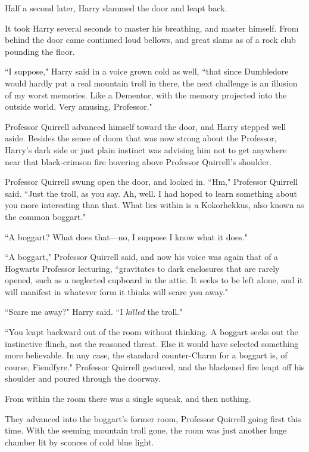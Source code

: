 \later

Half a second later, Harry slammed the door and leapt back.

It took Harry several seconds to master his breathing, and master himself. From behind the door came continued loud bellows, and great slams as of a rock club pounding the floor.

``I suppose," Harry said in a voice grown cold as well, ``that since Dumbledore would hardly put a real mountain troll in there, the next challenge is an illusion of my worst memories. Like a Dementor, with the memory projected into the outside world. Very amusing, Professor."

Professor Quirrell advanced himself toward the door, and Harry stepped well aside. Besides the sense of doom that was now strong about the Professor, Harry's dark side or just plain instinct was advising him not to get anywhere near that black-crimson fire hovering above Professor Quirrell's shoulder.

Professor Quirrell swung open the door, and looked in. ``Hm," Professor Quirrell said. ``Just the troll, as you say. Ah, well. I had hoped to learn something about you more interesting than that. What lies within is a Kokorhekkus, also known as the common boggart."

``A boggart? What does that—no, I suppose I know what it does."

``A boggart," Professor Quirrell said, and now his voice was again that of a Hogwarts Professor lecturing, ``gravitates to dark enclosures that are rarely opened, such as a neglected cupboard in the attic. It seeks to be left alone, and it will manifest in whatever form it thinks will scare you away."

``Scare me away?" Harry said. ``I \emph{killed} the troll."

``You leapt backward out of the room without thinking. A boggart seeks out the instinctive flinch, not the reasoned threat. Else it would have selected something more believable. In any case, the standard counter-Charm for a boggart is, of course, Fiendfyre." Professor Quirrell gestured, and the blackened fire leapt off his shoulder and poured through the doorway.

From within the room there was a single squeak, and then nothing.

They advanced into the boggart's former room, Professor Quirrell going first this time. With the seeming mountain troll gone, the room was just another huge chamber lit by sconces of cold blue light.

